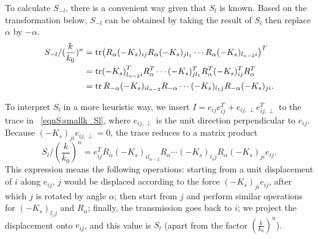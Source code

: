 \documentclass[
 amsmath,amssymb,
 aps,
 pre,
 longbibliography,
 10pt, onecolumn,
 notitlepage
]{revtex4-1}
\begin{document}
To calculate $S_{-l}$, there is a convenient way given that $S_l$ is known.
Based on the transformation below, $S_{-l}$ can be obtained by taking the result of $S_l$ then replace $\alpha$ by $-\alpha$.
\begin{equation} \label{eqnS:smallk_S-l}
    \begin{split}
    S_{-l} / (\frac{k}{k_0})^n
    &= \tr (R_\alpha (-K_s)_{ij} R_\alpha (-K_s)_{jl_1} \cdots R_\alpha  (-K_s)_{l_{n-2}i})^T \\
    &= \tr (-K_s)_{l_{n-2}i}^T R_\alpha^T \cdots (-K_s)_{jl_1}^T R_\alpha^T (-K_s)_{ij}^T R_\alpha^T \\
    &= \tr R_{-\alpha} (-K_s)_{il_{n-2}} R_{-\alpha} \cdots (-K_s)_{l_1j} R_{-\alpha} (-K_s)_{ji}.
    \end{split}
\end{equation}

To interpret $S_l$ in a more heuristic way, we insert $I = e_{ij}e_{ij}^T + e_{ij,\perp}e_{ij,\perp}^T$ to the trace in \eqnname~\eqref{eqnS:smallk_Sl}, where $e_{ij,\perp}$ is the unit direction perpendicular to $e_{ij}$.
Because $(-K_s)_{ji}e_{ij,\perp} = 0$, the trace reduces to a matrix product
\begin{equation} \label{eqnS:smallk_path_vector}
    S_l/(\frac{k}{k_0})^n = e_{ij}^T R_\alpha (-K_s)_{i l_{n-2}} R_\alpha \cdots (-K_s)_{l_1j} R_\alpha (-K_s)_{ji} e_{ij}.
\end{equation}
This expression means the following operations:
starting from a unit displacement of $i$ along $e_{ij}$, $j$ would be displaced according to the force $(-K_s)_{ji} e_{ij}$, after which $j$ is rotated by angle $\alpha$; then start from $j$ and perform similar operations for $(-K_s)_{l_1j}$ and $R_\alpha$; finally, the transmission goes back to $i$; we project the displacement onto $e_{ij}$, and this value is $S_l$ (apart from the factor $(\frac{k}{k_0})^n$).
\end{document}
